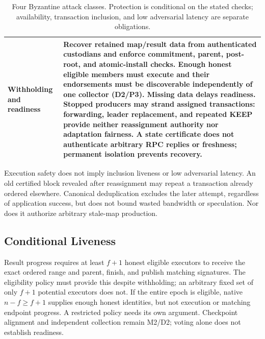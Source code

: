 \begin{table}[t]
\begin{tabularx}{\textwidth}{@{}>{\raggedright\arraybackslash}p{}X@{}}
\midrule
Withholding and readiness &
Recover retained map/result data from authenticated custodians and enforce commitment, parent, post-root, and atomic-install checks. Enough honest eligible members must execute and their endorsements must be discoverable independently of one collector (D2/P3). Missing data delays readiness. Stopped producers may strand assigned transactions: forwarding, leader replacement, and repeated KEEP provide neither reassignment authority nor adaptation fairness. A state certificate does not authenticate arbitrary RPC replies or freshness; permanent isolation prevents recovery. \\
\bottomrule
\end{tabularx}
\caption{Four Byzantine attack classes. Protection is conditional on the stated checks; availability, transaction inclusion, and low adversarial latency are separate obligations.}
\label{tab:byzantine}
\end{table}

Execution safety does not imply inclusion liveness or low adversarial latency. An old certified block revealed after reassignment may repeat a transaction already ordered elsewhere. Canonical deduplication excludes the later attempt, regardless of application success, but does not bound wasted bandwidth or speculation. Nor does it authorize arbitrary stale-map production.


\subsection{Conditional Liveness}

Result progress requires at least \(f+1\) honest eligible executors to receive the exact ordered range and parent, finish, and publish matching signatures. The eligibility policy must provide this despite withholding; an arbitrary fixed set of only \(f+1\) potential executors does not. If the entire epoch is eligible, native \(n-f\geq f+1\) supplies enough honest identities, but not execution or matching endpoint progress. A restricted policy needs its own argument. Checkpoint alignment and independent collection remain M2/D2; voting alone does not establish readiness.

